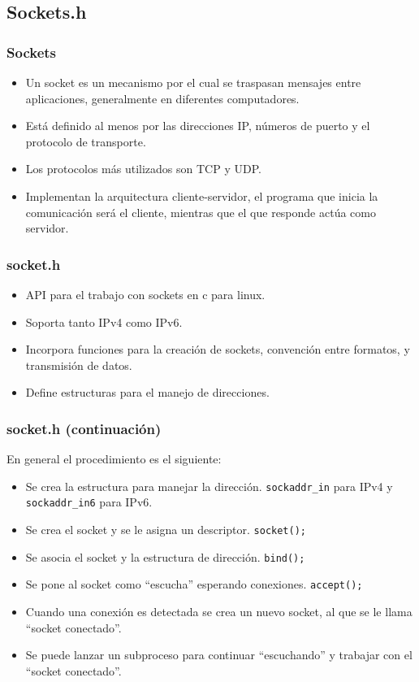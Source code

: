 \subsection{Sockets.h}
\begin{frame}
  \frametitle{Sockets}
  \begin{itemize}
  \item	
	  Un socket es un mecanismo por el cual se traspasan mensajes entre
	  aplicaciones, generalmente en diferentes computadores.
  \item	
	  Está definido al menos por las direcciones IP, números de puerto y el 
	  protocolo de transporte.
  \item
	  Los protocolos más utilizados son TCP y UDP.
  \item
	  Implementan la arquitectura cliente-servidor, el programa que inicia la 
	  comunicación será el cliente, mientras que el que responde actúa como
	  servidor.
  \end{itemize}
\end{frame}

\begin{frame}
  \frametitle{socket.h}
  \begin{itemize}
  \item	
	  API para el trabajo con sockets en c para linux.
  \item
	  Soporta tanto IPv4 como IPv6.
  \item
	  Incorpora funciones para la creación de sockets, convención entre
	  formatos, y transmisión de datos.
  \item
	  Define estructuras para el manejo de direcciones.
  \end{itemize}
\end{frame}

\begin{frame}
	\frametitle{socket.h (continuación)}
	En general el procedimiento es el siguiente:
	\begin{itemize}
		\item
			Se crea la estructura para manejar la dirección.
			\texttt{sockaddr\_in} para IPv4 y \texttt{sockaddr\_in6} para IPv6.
		\item
			Se crea el socket y se le asigna un descriptor.
			\texttt{socket();}
		\item
			Se asocia el socket y la estructura de dirección. \texttt{bind();} 
		\item
			Se pone al socket como ``escucha'' esperando conexiones.
			\texttt{accept();}
		\item
			Cuando una conexión es detectada se crea un nuevo socket, al que se
			le llama ``socket conectado''.
		\item
			Se puede lanzar un subproceso para continuar ``escuchando'' y 
			trabajar con el ``socket conectado''.
	\end{itemize}
\end{frame}

%	
